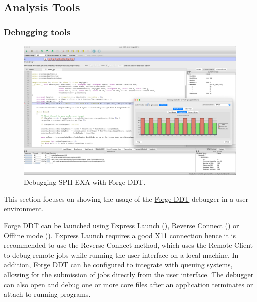 \subsection{Analysis Tools}

\subsubsection{Debugging tools}

\begin{figure}[htp!]
    \begin{center}
        \includegraphics[width=\textwidth]{./images/sph-ddt-uenv.png}
    \end{center}
    \caption{Debugging SPH-EXA with Forge DDT.}
    \label{fig:sph-ddt-uenv}
\end{figure}

This section focuses on showing the usage of the \href{https://www.linaroforge.com}{Forge DDT} debugger in a user-environment. 

Forge DDT can be launched using Express Launch (), Reverse Connect () or Offline mode (). 
Express Launch requires a good X11 connection hence it is recommended to use the Reverse Connect method, which uses the Remote Client to debug remote jobs while running the user interface on a local machine.
In addition, Forge DDT can be configured to integrate with queuing systems, allowing for the submission of jobs directly from the user interface.
The debugger can also open and debug one or more core files after an application terminates or attach to running programs.

